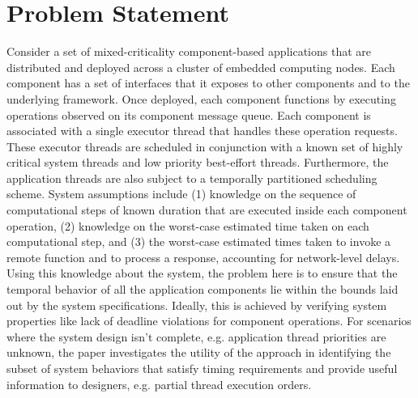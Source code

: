 \section{Problem Statement}
\label{sec:Problem_Statement}

\vspace{-0.05in}
Consider a set of mixed-criticality component-based applications that are distributed and deployed across a cluster of embedded computing nodes. Each component has a set of interfaces that it exposes to other components and to the underlying framework. Once deployed, each component functions by executing operations observed on its component message queue. Each component is associated with a single executor thread that handles these operation requests. These executor threads are scheduled in conjunction with a known set of highly critical system threads and low priority best-effort threads. Furthermore, the application threads are also subject to a temporally partitioned scheduling scheme. System assumptions include (1) knowledge on the sequence of computational steps of known duration that are executed inside each component operation, (2) knowledge on the worst-case estimated time taken on each computational step, and (3) the worst-case estimated times taken to invoke a remote function and to process a response, accounting for network-level delays. Using this knowledge about the system, the problem here is to ensure that the temporal behavior of all the application components lie within the bounds laid out by the system specifications. Ideally, this is achieved by verifying system properties like lack of deadline violations for component operations. For scenarios where the system design isn't complete, e.g. application thread priorities are unknown, the paper investigates the utility of the approach in identifying the subset of system behaviors that satisfy timing requirements and provide useful information to designers, e.g. partial thread execution orders. %
